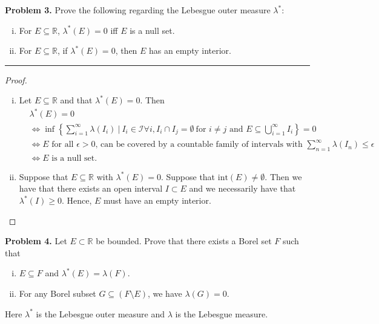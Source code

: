 \documentclass[leqno]{article}
\theoremstyle{nonumberplain}
\newtheorem{proof}{Proof}
\newcommand{\R}{\mathbb{R}}
\begin{document}
\noindent\textbf{Problem 3.} \quad
Prove the following regarding the Lebesgue outer measure $\lambda^*$:
\begin{enumerate}[(i)]
\item For $E\subseteq \R$, $\lambda^*(E)=0$ iff $E$ is a null set.
\item For $E\subseteq \R$, if $\lambda^*(E)=0$, then $E$ has an empty interior.
\end{enumerate}

\noindent\rule[0.5ex]{\linewidth}{1pt}

\begin{proof}~
\begin{enumerate}[(i)]
\item Let $E\subseteq \R$ and that $\lambda^*(E)=0$.  Then 
\begin{align*}
&\lambda^*(E)=0\\
&\iff \inf\left\{\sum_{i=1}^\infty \lambda(I_i) ~\vert~ I_i \in \mathcal{I} \forall i, I_i \cap I_j = \emptyset ~\textrm{for } i\neq j \textrm{ and } E\subseteq \bigcup_{i=1}^\infty I_i\right\}=0\\
&\iff E \textrm{ for all $\epsilon>0$, can be covered by a countable family of intervals with $\sum_{n=1}^\infty \lambda(I_n)\leq \epsilon$}\\
&\iff E \textrm{ is a null set.}
\end{align*}
\item Suppose that $E\subseteq \R$ with $\lambda^*(E)=0$.  Suppose that $\textrm{int}(E) \neq \emptyset$. Then we have that there exists an open interval $I \subset E$ and we necessarily have that $\lambda^*(I)\geq 0$. Hence, $E$ must have an empty interior.
\end{enumerate}
\end{proof}

\pagebreak




\noindent\textbf{Problem 4.} \quad
Let $E\subset \R$ be bounded. Prove that there exists a Borel set $F$ such that 
\begin{enumerate}[(i)]
\item $E\subseteq F$ and $\lambda^*(E)=\lambda(F)$.
\item For any Borel subset $G\subseteq (F\setminus E)$, we have $\lambda(G)=0$.
\end{enumerate}
Here $\lambda^*$ is the Lebesgue outer measure and $\lambda$ is the Lebesgue measure.
\end{document}
